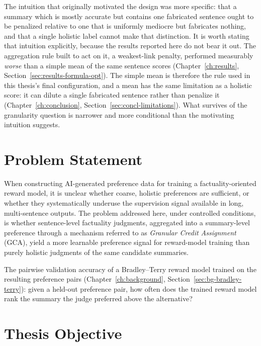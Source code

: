 The intuition that originally motivated the design was more specific: that a
summary which is mostly accurate but contains one fabricated sentence ought to be
penalized relative to one that is uniformly mediocre but fabricates nothing, and
that a single holistic label cannot make that distinction. It is worth stating
that intuition explicitly, because the results reported here do not bear it out.
The aggregation rule built to act on it, a weakest-link penalty, performed
measurably \emph{worse} than a simple mean of the same sentence scores
(Chapter~\ref{ch:results}, Section~\ref{sec:results-formula-opt}). The simple
mean is therefore the rule used in this thesis's final configuration, and a
mean has the same limitation as a holistic score: it can dilute a single
fabricated sentence rather than penalize it
(Chapter~\ref{ch:conclusion}, Section~\ref{sec:concl-limitations}). What
survives of the granularity question is narrower and more conditional than
the motivating intuition suggests.

\section{Problem Statement}
\label{sec:intro-problem}

When constructing AI-generated preference data for training a factuality-oriented
reward model, it is unclear whether coarse, holistic preferences are sufficient, or
whether they systematically underuse the supervision signal available in long,
multi-sentence outputs. The problem addressed here, under controlled conditions, is
whether sentence-level factuality judgments, aggregated into a summary-level
preference through a mechanism referred to as \emph{Granular Credit Assignment}
(GCA), yield a more learnable preference signal for reward-model training than
purely holistic judgments of the same candidate summaries.

\begin{definitionbox}
The pairwise validation accuracy of a Bradley--Terry reward model trained on
the resulting preference pairs (Chapter~\ref{ch:background},
Section~\ref{sec:bg-bradley-terry}): given a held-out preference pair, how
often does the trained reward model rank the summary the judge preferred
above the alternative?
\end{definitionbox}

\section{Thesis Objective}
\label{sec:intro-objective}

